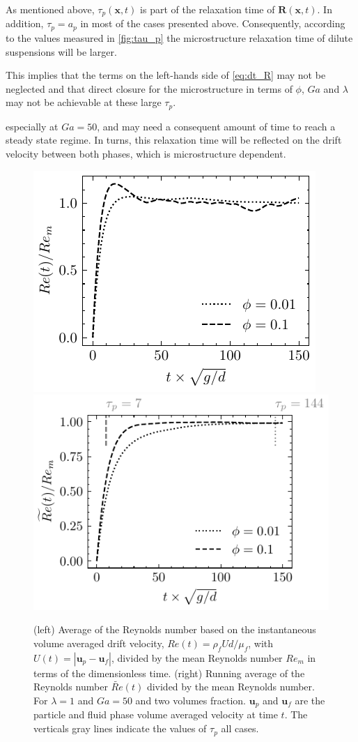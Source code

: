 




As mentioned above, $\tau_p(\textbf{x},t)$ is part of the relaxation time of $\textbf{R}(\textbf{x},t)$. 
In addition, $\tau_p = a_p$ in most of the cases presented above. 
Consequently, according to the values measured in \ref{fig:tau_p} the microstructure relaxation time of dilute suspensions will be larger.

This implies that the terms on the left-hands side of \ref{eq:dt_R} may not be neglected and that direct closure for the microstructure in terms of $\phi$, $Ga$ and $\lambda$ may not be achievable at these large $\tau_p$. 

especially at $Ga = 50$, and may need a consequent amount of time to reach a steady state regime. 
In turns, this relaxation time will be reflected on the drift velocity between both phases, which is microstructure dependent. 
\begin{figure}
    \centering
    \includegraphics[height=0.325\textwidth]{image/HOMOGENEOUS_NEW/CA/Relax2.pdf}
    \includegraphics[height=0.35\textwidth]{image/HOMOGENEOUS_NEW/CA/Relax.pdf}
    \caption{
        (left) Average of the Reynolds number based on the instantaneous volume averaged drift velocity, $Re(t) = \rho_fU d /\mu_f$, with $U(t) = |\textbf{u}_p - \textbf{u}_f|$, divided by the mean Reynolds number $Re_m$ in terms of the dimensionless time. 
        (right) Running average of the Reynolds number $\widetilde{Re}(t)$ divided by the mean Reynolds number.
        For $\lambda = 1$ and $Ga = 50$ and two volumes fraction. 
        $\textbf{u}_p$ and $\textbf{u}_f$ are the particle and fluid phase volume averaged velocity at time $t$.
        The verticals gray lines indicate the values of $\tau_p$ all cases. 
        }
        \label{fig:relax}
\end{figure}
